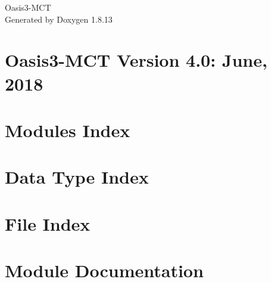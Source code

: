 \documentclass[twoside]{book}
\newcommand{\+}{\discretionary{\mbox{\scriptsize$\hookleftarrow$}}{}{}}
\newcommand{\clearemptydoublepage}{%
  \newpage{\pagestyle{empty}\cleardoublepage}%
}
\begin{document}
\hypersetup{pageanchor=false,
             bookmarksnumbered=true,
             pdfencoding=unicode
            }
\begin{titlepage}
\vspace*{7cm}
\begin{center}%
{\Large Oasis3-\/\+M\+CT }\\
\vspace*{1cm}
{\large Generated by Doxygen 1.8.13}\\
\end{center}
\end{titlepage}
\clearemptydoublepage
{}
\tableofcontents
\clearemptydoublepage
{}
\hypersetup{pageanchor=true}

\chapter{Oasis3-\/\+M\+CT Version 4.0\+: June, 2018}
\label{index}\hypertarget{index}{}
\chapter{Modules Index}

\chapter{Data Type Index}

\chapter{File Index}

\chapter{Module Documentation}

























\end{document}
